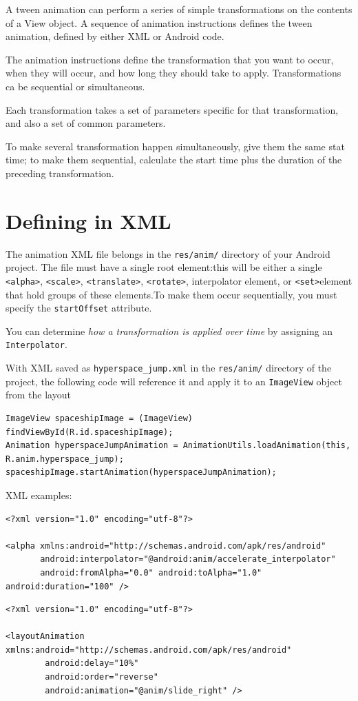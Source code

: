 \documentclass[11pt, a4paper]{book}
\begin{document}
A tween animation can perform a series of simple transformations on the contents
of a View object. A sequence of animation instructions defines the tween
animation, defined by either XML or Android code.  

The animation instructions define the transformation that you want to occur,
when they will occur, and how long they should take to apply. Transformations ca
be sequential or simultaneous.

Each transformation takes a set of parameters specific for that transformation,
and also a set of common parameters.

To make several transformation happen simultaneously, give them the same stat
time; to make them sequential, calculate the start time plus the duration of the
preceding transformation.

\section{Defining in XML}
The animation XML file belongs in the \verb|res/anim/| directory of your Android
project. The file must have a single root element:this will be either a single
\verb|<alpha>|, \verb|<scale>|, \verb|<translate>|, \verb|<rotate>|,
interpolator element, or \verb|<set>|element that hold groups of these
elements.To make them occur sequentially, you must specify the
\verb|startOffset| attribute.

You can determine \emph{how a transformation is applied over time} by assigning
an \verb|Interpolator|.

With XML saved as \verb|hyperspace_jump.xml| in the \verb|res/anim/| directory
of the project, the following code will reference it and apply it to an
\verb|ImageView| object from the layout
\begin{verbatim}
ImageView spaceshipImage = (ImageView) findViewById(R.id.spaceshipImage);
Animation hyperspaceJumpAnimation = AnimationUtils.loadAnimation(this, R.anim.hyperspace_jump);
spaceshipImage.startAnimation(hyperspaceJumpAnimation);
\end{verbatim}

XML examples:
\begin{verbatim}
<?xml version="1.0" encoding="utf-8"?>

<alpha xmlns:android="http://schemas.android.com/apk/res/android"
       android:interpolator="@android:anim/accelerate_interpolator"
       android:fromAlpha="0.0" android:toAlpha="1.0" android:duration="100" />
\end{verbatim}
\begin{verbatim}
<?xml version="1.0" encoding="utf-8"?>

<layoutAnimation xmlns:android="http://schemas.android.com/apk/res/android"
        android:delay="10%"
        android:order="reverse"
        android:animation="@anim/slide_right" />
\end{verbatim}
\end{document}

